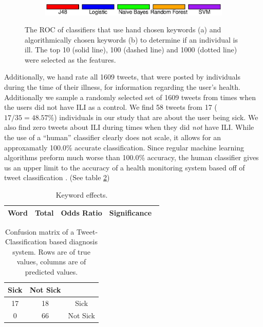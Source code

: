 \documentclass{acm_proc_article-sp}
\begin{document}
\begin{figure} [h]
\begin{subfigure}[b]{.2\textwidth}
\end{subfigure}
\begin{subfigure}[b]{.45\textwidth}
\includegraphics[width=\textwidth]{figs/keyword_legend.eps}
\end{subfigure}
\caption{The ROC of classifiers that use hand chosen keywords (a) and algorithmically chosen keywords (b) to determine if an individual is ill. The top 10 (solid line), 100 (dashed line) and 1000 (dotted line) were selected as the features.}
\label{fig:roc_keyword}
\end{figure}



Additionally, we hand rate all 1609 tweets, that were posted by individuals during the time of their illness,  for information regarding the user's health. Additionally we sample a randomly selected set of 1609 tweets from times when the users did not have ILI as a control. We find 58 tweets from 17 (\(17/35 = 48.57\%\))  individuals in our study that are about the user being sick. We also find zero tweets about ILI during times when they did \textit{not} have ILI. While the use of a ``human'' classifier clearly does not scale, it allows for an approxamatly 100.0\% accurate classification. Since regular machine learning algorithms preform much worse than 100.0\% accuracy, the human classifier gives us an upper limit to the accuracy of  a health monitoring system based off of tweet classification . (See table \ref{tab:tweet_classified_confusion})

%

\begin{table}
\centering
\begin{tabular}{|c|c|c|c|} \hline
Word& Total &Odds Ratio & Significance\ \\ \hline

\end{tabular}
\caption{Keyword effects.}
\label{tab:tweet_keyword_expert_results}
\end{table}


\begin{table}
\centering
\begin{tabular}{|c|c|c|} \hline
Sick&Not Sick&\ \\ \hline
17 & 18 & Sick\\ \hline
0 & 66  & Not Sick\\
\hline\end{tabular}
\caption{Confusion matrix of a Tweet-Classification based diagnosis system. Rows are of true values, columns are of predicted values.}
\label{tab:tweet_classified_confusion}
\end{table}
\end{document}
